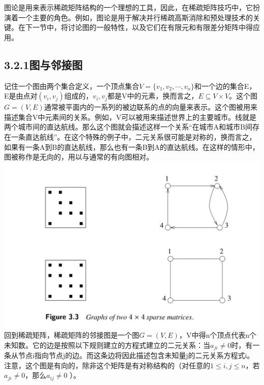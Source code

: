 \documentclass{article}
\begin{document}
图论是用来表示稀疏矩阵结构的一个理想的工具，因此，在稀疏矩阵技巧中，它扮演着一个主要的角色。例如，图论是用于解决并行稀疏高斯消除和预处理技术的关键。在下一节中，将讨论图的一般特性，以及它们在有限元和有限差分矩阵中得应用。
\newline
\subsection*{3.2.1图与邻接图}
记住一个图由两个集合定义，一个顶点集合$V =\{v_1,v_2,\cdots,v_n\}$和一个边的集合E，E是由点对$(v_i,v_j)$组成的，$v_i,v_j$都是V中的元素，换而言之，$E\subseteq V\times V$。这个图$G=(V,E)$通常被平面内的一系列的被边联系的点的向量来表示。这个图被用来描述集合V中元素间的关系。例如，V可以被用来描述世界上的主要城市。线就是两个城市间的直达航线。那么这个图就会描述这样一个关系“在城市A和城市B间存在一条直达航线”。在这个特殊的例子中，二元关系很可能是对称的，换而言之，如果有一条A到B的直达航线，那么也有一条B到A的直达航线。在这样的情形中，图被称作是无向的，用以与通常的有向图相对。
  \newline\newline\newline\newline\newline\newline\newline\newline\newline
\includegraphics[scale=0.25]{3_3.png}
\newline\newline
回到稀疏矩阵，稀疏矩阵的邻接图是一个图$G=(V,E)$，V中得n个顶点代表n个未知数。它的边是按照以下规则建立的方程式建立的二元关系：当$a_{ji}\neq0$时，有一条从节点i指向节点j的边。而这条边将因此描述包含未知量j的二元关系方程式i。注意，这个图是有向的，除非这个矩阵是有对称结构的（对任意的$1\leq i,j\leq n$，若$a_{ji}\neq 0$，那么$a_{ij}\neq 0$ ）。
\end{document}
